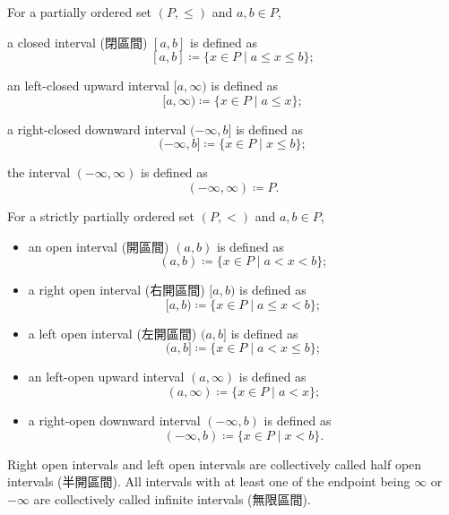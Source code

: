 \documentclass[a4paper,12pt]{article}
\begin{document}
For a partially ordered set $(P,\leq)$ and $a,b\in P$, 
\bit
\item a closed interval (閉區間) $[a,b]$ is defined as
\[[a,b]\coloneq\{x\in P\mid a\leq x\leq b\};\]
\item an left-closed upward interval $[a,\infty)$ is defined as
\[[a,\infty)\coloneq\{x\in P\mid a\leq x\};\]
\item a right-closed downward interval $(-\infty,b]$ is defined as
\[(-\infty,b]\coloneq\{x\in P\mid x\leq b\};\]
\item the interval $(-\infty,\infty)$ is defined as
\[(-\infty,\infty)\coloneq P.\]
\eit

For a strictly partially ordered set $(P,<)$ and $a,b\in P$,
\begin{itemize}
\item an open interval (開區間) $(a,b)$ is defined as
\[(a,b)\coloneq\{x\in P\mid a<x<b\};\]
\item a right open interval (右開區間) $[a,b)$ is defined as
\[[a,b)\coloneq\{x\in P\mid a\leq x<b\};\]
\item a left open interval (左開區間) $(a,b]$ is defined as
\[(a,b]\coloneq\{x\in P\mid a<x\leq b\};\]
\item an left-open upward interval $(a,\infty)$ is defined as
\[(a,\infty)\coloneq\{x\in P\mid a<x\};\]
\item a right-open downward interval $(-\infty,b)$ is defined as
\[(-\infty,b)\coloneq\{x\in P\mid x<b\}.\]
\end{itemize}

Right open intervals and left open intervals are collectively called half open intervals (半開區間). All intervals with at least one of the endpoint being $\infty$ or $-\infty$ are collectively called infinite intervals (無限區間).
\end{document}
